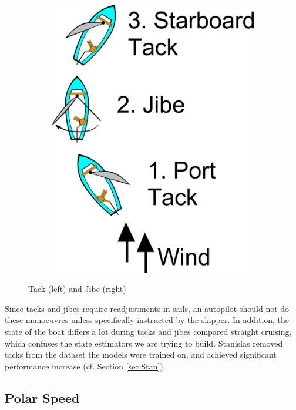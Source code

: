 \documentclass[12pt,twoside]{report}
\begin{document}
\begin{figure}[h]
\begin{subfigure}[b]{0.22\textwidth}
        \includegraphics[width=\textwidth]{figures/sailing/jibe.png}
        \label{fig:jibe}
    \end{subfigure}
    \caption{Tack (left) and Jibe (right) \cite{img:sailing-tack-gybe}}
    \label{fig:tack-jibe}
\end{figure}

Since tacks and jibes require readjustments in sails, an autopilot should not do these manoeuvres unless specifically instructed by the skipper. In addition, the state of the boat differs a lot during tacks and jibes compared straight cruising, which confuses the state estimators we are trying to build. Stanislas \cite{stan} removed tacks from the dataset the models were trained on, and achieved significant performance increase (cf. Section \ref{sec:Stan}).

\subsection{Polar Speed}
\end{document}
